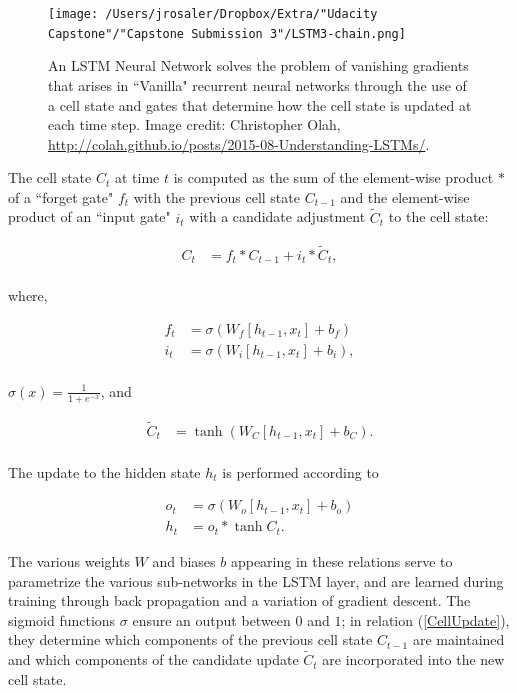 \documentclass{article}
\begin{document}
\begin{figure}[]
\texttt{[image: /Users/jrosaler/Dropbox/Extra/"Udacity Capstone"/"Capstone Submission 3"/LSTM3-chain.png]}
\caption{An LSTM Neural Network solves the problem of vanishing gradients that arises in ``Vanilla" recurrent neural networks through the use of a cell state and gates that determine how the cell state is updated at each time step. Image credit: Christopher Olah, \url{http://colah.github.io/posts/2015-08-Understanding-LSTMs/}. }
\label{LSTMChain}
\end{figure}


The cell state $C_{t}$ at time $t$ is computed as the sum of the element-wise product $*$ of a ``forget gate" $f_{t}$ with the previous cell state $ C_{t-1}$ and the element-wise product of an ``input gate"  $i_{t}$ with a candidate adjustment $ \tilde{C}_{t}$ to the cell state: 

\begin{align} \label{CellUpdate}
C_{t} &= f_{t} * C_{t-1} + i_{t} * \tilde{C}_{t}, \\
\end{align}

\noindent where,


\begin{align}
f_{t} &= \sigma(W_{f} [h_{t-1}, x_{t} ] + b_{f}) \\
i_{t} &= \sigma(W_{i} [h_{t-1}, x_{t}] + b_{i} ), \\
\end{align}

\noindent $\sigma(x) = \frac{1}{1 + e^{-x}}$, and 

\begin{align}
\tilde{C}_{t} &= \tanh(W_{C} [h_{t-1}, x_{t}] + b_{C}). \\
\end{align}

\noindent The update to the hidden state $h_{t}$ is performed according to 

\begin{align}
o_{t} &= \sigma(W_{o}  [h_{t-1}, x_{t}] + b_{o}) \\
h_{t} &= o_{t} * \tanh{C_{t}}. 
\end{align}

\noindent The various weights $W$ and biases $b$ appearing in these relations serve to parametrize the various sub-networks in the LSTM layer, and are learned during training through back propagation and a variation of gradient descent. The sigmoid functions $\sigma$ ensure an output between $0$ and $1$; in relation (\ref{CellUpdate}), they determine which components of the previous cell state $C_{t-1}$ are maintained and which components of the candidate update $\tilde{C}_{t}$ are incorporated into the new cell state. 
\end{document}
